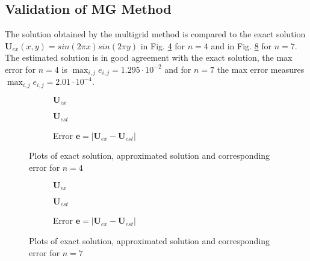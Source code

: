 \documentclass[11pt,a4paper]{article}
\newcommand{\refFig}[1]{Fig. \ref{#1}}
\begin{document}
\subsection{Validation of MG Method}
The solution obtained by the multigrid method is compared to the exact solution $\mathbf{U}_{ex}(x,y) = sin(2\pi x)sin(2 \pi y)$ in \refFig{fig::Val4} for $n=4$ and in \refFig{fig::Val7} for $n=7$. The estimated solution is in good agreement with the exact solution, the max error for $n=4$ is $\max_{i,j} e_{i,j} = 1.295 \cdot 10^{-2}$ and for $n=7$ the max error measures $\max_{i,j} e_{i,j} = 2.01 \cdot 10^{-4}$. 
%
\begin{figure}[h!]
	\centering
	\begin{subfigure}[h!]{.3\textwidth}
			\centering
			\resizebox{0.4\width}{!}{}
			\caption{$\mathbf{U}_{ex}$}
			\label{fig::Uex4}
	\end{subfigure}
	\hfill
	\begin{subfigure}[h!]{.3\textwidth}
		\centering
		\resizebox{0.4\width}{!}{}
		\caption{$\mathbf{U}_{est}$}
		\label{fig::Uest4}
	\end{subfigure}
	\hfill
	\begin{subfigure}[h!]{.3\textwidth}
		\centering
		\resizebox{0.4\width}{!}{}
		\caption{Error $\mathbf{e} = |\mathbf{U}_{ex} - \mathbf{U}_{est}|$}
		\label{fig::Error4}
	\end{subfigure}
	\label{fig::Val4}
	\caption{Plots of exact solution, approximated solution and corresponding error for $n=4$ }
	\label{fig::Val4}
\end{figure}
%
\begin{figure}[h!]
	\centering
	\begin{subfigure}[h!]{.3\textwidth}
		\centering
		\resizebox{0.4\width}{!}{}
		\caption{$\mathbf{U}_{ex}$}
		\label{fig::Uex7}
	\end{subfigure}
	\hfill
	\begin{subfigure}[h!]{.3\textwidth}
		\centering
		\resizebox{0.4\width}{!}{}
		\caption{$\mathbf{U}_{est}$}
		\label{fig::Uest7}
	\end{subfigure}
	\hfill
	\begin{subfigure}[h!]{.3\textwidth}
		\centering
		\resizebox{0.4\width}{!}{}
		\caption{Error $\mathbf{e} = |\mathbf{U}_{ex} - \mathbf{U}_{est}|$}
		\label{fig::Error7}
	\end{subfigure}
	\caption{Plots of exact solution, approximated solution and corresponding error for $n=7$ }
	\label{fig::Val7}
\end{figure}
%
\end{document}
